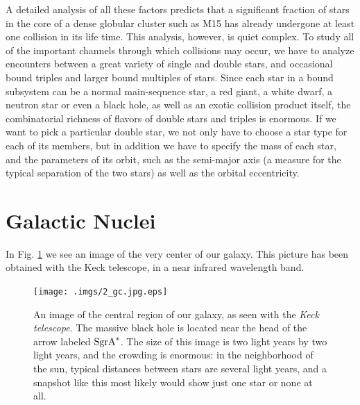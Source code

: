 \documentclass{book}
\begin{document}
A detailed analysis of all these factors predicts that a significant
fraction of stars in the core of a dense globular cluster such as M15
has already undergone at least one collision in its life time.  This
analysis, however, is quiet complex.  To study all of the important
channels through which collisions may occur, we have to analyze
encounters between a great variety of single and double stars, and
occasional bound triples and larger bound multiples of stars.  Since
each star in a bound subsystem can be a normal main-sequence star, a
red giant, a white dwarf, a neutron star or even a black hole, as well
as an exotic collision product itself, the combinatorial richness of
flavors of double stars and triples is enormous.  If we want to pick a
particular double star, we not only have to choose a star type for
each of its members, but in addition we have to specify the mass of
each star, and the parameters of its orbit, such as the semi-major axis
(a measure for the typical separation of the two stars) as well as the
orbital eccentricity.

\section{  Galactic Nuclei}
\label{sect:7}

In Fig. \ref{gc} we see an image of the very center of our galaxy.
This picture has been obtained with the Keck telescope,
in a near infrared wavelength band.


 
\begin{figure}
\begin{minipage}{\columnwidth}
\begin{center}
\renewcommand{\thefootnote}{\fnsymbol{footnote}}
    \texttt{[image: .imgs/2\_gc.jpg.eps]}
\caption{An image of the central region of our galaxy, as seen with the
 {\it Keck telescope\protect \footnotemark[1]}.
The massive black hole is located near the head of the arrow labeled
 ${\rm Sgr A}^*$.  The size of this image is two light
years by two light years, and the crowding is enormous: in the
neighborhood of the sun, typical distances between stars are several
light years, and a snapshot like this most likely would show just one
star or none at all.
}

\label{gc}
\end{center}
\end{minipage}
\end{figure}
\end{document}
